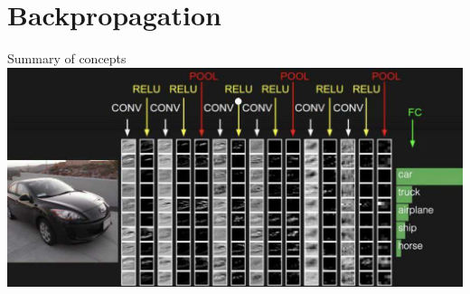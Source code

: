 \documentclass[default, aspectratio=169]{beamer}
\begin{document}
	
	\section{Backpropagation}
	\begin{frame}{Summary of concepts}
		\centering
		\includegraphics[keepaspectratio, scale=0.65]{pic/car.png}
	\end{frame}
	
\end{document}

